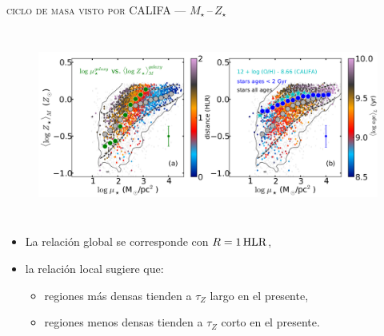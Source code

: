 \documentclass[xcolor=dvipsnames,4pt,fleqn,hyperref={colorlinks,citecolor=black,linkcolor=black,urlcolor=black}]{beamer}
\begin{document}
\begin{frame}{\textsc{ciclo de masa visto por CALIFA --- $M_\star\,$--$\,Z_\star$}}

\begin{columns}
\begin{figure}
\flushleft\citep{Gonzalez2014b}
\includegraphics[width=\textwidth]{img/gonzalez2014b-2}
\end{figure}

\end{columns}

\begin{itemize}\scriptsize
\setlength\itemsep{0.5em}
\item La {\color{ForestGreen}relación global} se corresponde con $R=\unit[1]{HLR}$,
\item la {\color{gray}relación local} sugiere que:
\begin{itemize}\scriptsize
\item regiones más densas tienden a $\tau_Z$ largo en el presente,
\item regiones menos densas tienden a $\tau_Z$ corto en el presente.
\end{itemize}
\end{itemize}

\end{frame}
\end{document}
